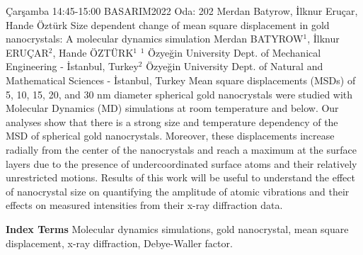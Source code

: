 
    \begin{abstract_basarim}
    {Çarşamba 14:45-15:00}
    {BASARIM2022}
    {Oda: 202}
    {Merdan Batyrow, İlknur Eruçar, Hande Öztürk}
    {Size dependent change of mean square displacement in gold nanocrystals: \newline A molecular dynamics simulation}
    {%
    Merdan BATYROW$^{1}$, İlknur ERUÇAR$^{2}$, Hande ÖZTÜRK$^{1}$}
    {%
    }
    {%
    $^1$ Özyeğin University Dept. of Mechanical Engineering - İstanbul, Turkey\newline{}$^2$ Özyeğin University Dept. of Natural and Mathematical Sciences - İstanbul, Turkey}
    Mean square displacements (MSDs) of 5, 10, 15, 20, and 30 nm diameter spherical gold nanocrystals were studied with Molecular Dynamics (MD) simulations at room temperature and below. Our analyses show that there is a strong size and temperature dependency of the MSD of spherical gold nanocrystals. Moreover, these displacements increase radially from the center of the nanocrystals and reach a maximum at the surface layers due to the presence of undercoordinated surface atoms and their relatively unrestricted motions. Results of this work will be useful to understand the effect of nanocrystal size on quantifying the amplitude of atomic vibrations and their effects on measured intensities from their x-ray diffraction data. 
    
            \textbf{Index Terms} \newline{}Molecular dynamics simulations, gold nanocrystal, mean square displacement, x-ray diffraction, Debye-Waller factor.
    \end{abstract_basarim}
    